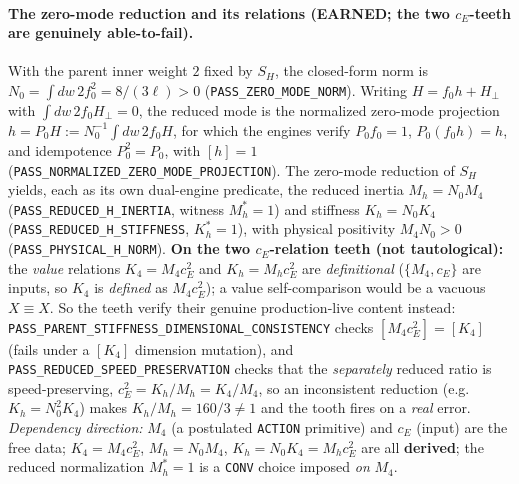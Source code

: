 \paragraph{The zero-mode reduction and its relations (EARNED; the two \(c_E\)-teeth are genuinely able-to-fail).}
With the parent inner weight \(2\) fixed by \(S_H\), the closed-form norm is
\(N_0=\int dw\,2f_0^2=8/(3\ell)>0\) (\texttt{PASS\_ZERO\_MODE\_NORM}). Writing
\(H=f_0 h+H_\perp\) with \(\int dw\,2f_0 H_\perp=0\), the reduced mode is the
normalized zero-mode projection \(h=P_0H:=N_0^{-1}\!\int dw\,2f_0 H\), for which
the engines verify \(P_0 f_0=1\), \(P_0(f_0 h)=h\), and idempotence
\(P_0^2=P_0\), with \([h]=1\) (\texttt{PASS\_NORMALIZED\_ZERO\_MODE\_PROJECTION}).
The zero-mode reduction of \(S_H\) yields, each as its own dual-engine
predicate, the reduced inertia \(M_h=N_0 M_4\) (\texttt{PASS\_REDUCED\_H\_INERTIA},
witness \(M_h^*=1\)) and stiffness \(K_h=N_0 K_4\)
(\texttt{PASS\_REDUCED\_H\_STIFFNESS}, \(K_h^*=1\)), with physical positivity
\(M_4 N_0>0\) (\texttt{PASS\_PHYSICAL\_H\_NORM}). \textbf{On the two
\(c_E\)-relation teeth (not tautological):} the \emph{value} relations
\(K_4=M_4 c_E^2\) and \(K_h=M_h c_E^2\) are \emph{definitional} (\(\{M_4,c_E\}\)
are inputs, so \(K_4\) is \emph{defined} as \(M_4 c_E^2\)); a value
self-comparison would be a vacuous \(X\equiv X\). So the teeth verify their
genuine production-live content instead:
\texttt{PASS\_PARENT\_STIFFNESS\_DIMENSIONAL\_CONSISTENCY} checks
\([M_4 c_E^2]=[K_4]\) (fails under a \([K_4]\) dimension mutation), and
\texttt{PASS\_REDUCED\_SPEED\_PRESERVATION} checks that the \emph{separately}
reduced ratio is speed-preserving, \(c_E^2=K_h/M_h=K_4/M_4\), so an inconsistent
reduction (e.g.\ \(K_h=N_0^2K_4\)) makes \(K_h/M_h=160/3\ne1\) and the tooth
fires on a \emph{real} error. \emph{Dependency direction:} \(M_4\) (a postulated
\texttt{ACTION} primitive) and \(c_E\) (input) are the free data;
\(K_4=M_4 c_E^2\), \(M_h=N_0 M_4\), \(K_h=N_0 K_4=M_h c_E^2\) are all
\textbf{derived}; the reduced normalization \(M_h^*=1\) is a \texttt{CONV} choice
imposed \emph{on} \(M_4\).

